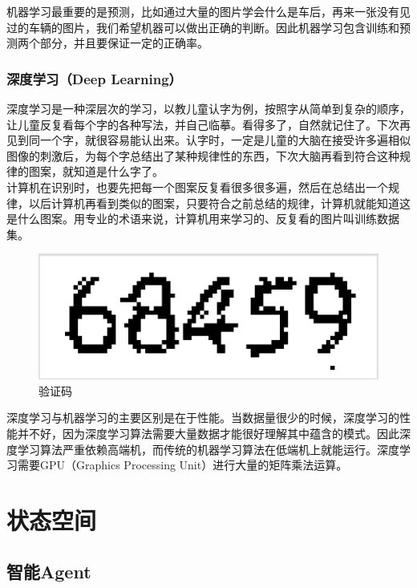 机器学习最重要的是预测，比如通过大量的图片学会什么是车后，再来一张没有见过的车辆的图片，我们希望机器可以做出正确的判断。因此机器学习包含训练和预测两个部分，并且要保证一定的正确率。\\

\subsubsection{深度学习（Deep Learning）}

深度学习是一种深层次的学习，以教儿童认字为例，按照字从简单到复杂的顺序，让儿童反复看每个字的各种写法，并自己临摹。看得多了，自然就记住了。下次再见到同一个字，就很容易能认出来。认字时，一定是儿童的大脑在接受许多遍相似图像的刺激后，为每个字总结出了某种规律性的东西，下次大脑再看到符合这种规律的图案，就知道是什么字了。\\

计算机在识别时，也要先把每一个图案反复看很多很多遍，然后在总结出一个规律，以后计算机再看到类似的图案，只要符合之前总结的规律，计算机就能知道这是什么图案。用专业的术语来说，计算机用来学习的、反复看的图片叫训练数据集。

\begin{figure}[H]
    \centering
    \includegraphics[scale=0.5]{img/Chapter1/1-1/2.png}
    \caption{验证码}
\end{figure}

深度学习与机器学习的主要区别是在于性能。当数据量很少的时候，深度学习的性能并不好，因为深度学习算法需要大量数据才能很好理解其中蕴含的模式。因此深度学习算法严重依赖高端机，而传统的机器学习算法在低端机上就能运行。深度学习需要GPU（Graphics Processing Unit）进行大量的矩阵乘法运算。

\newpage

\section{状态空间}

\subsection{智能Agent}

